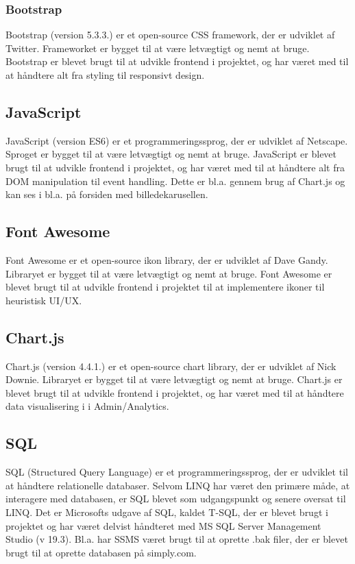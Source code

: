 \subsubsection{Bootstrap}
Bootstrap (version 5.3.3.) er et open-source CSS framework, der er udviklet af Twitter. Frameworket er bygget til at være letvægtigt og nemt at bruge.
Bootstrap er blevet brugt til at udvikle frontend i projektet, og har været med til at håndtere alt fra styling til responsivt design.

\subsection{JavaScript}
JavaScript (version ES6) er et programmeringssprog, der er udviklet af Netscape. Sproget er bygget til at være letvægtigt og nemt at bruge.
JavaScript er blevet brugt til at udvikle frontend i projektet, og har været med til at håndtere alt fra DOM manipulation til event handling.
Dette er bl.a. gennem brug af Chart.js og kan ses i bl.a. på forsiden med billedekarusellen.

\subsection{Font Awesome}
Font Awesome er et open-source ikon library, der er udviklet af Dave Gandy. Libraryet er bygget til at være letvægtigt og nemt at bruge.
Font Awesome er blevet brugt til at udvikle frontend i projektet til at implementere ikoner til heuristisk UI/UX.

\subsection{Chart.js}
Chart.js (version 4.4.1.) er et open-source chart library, der er udviklet af Nick Downie. Libraryet er bygget til at være letvægtigt og nemt at bruge.
Chart.js er blevet brugt til at udvikle frontend i projektet, og har været med til at håndtere data visualisering i i Admin/Analytics.

\subsection{SQL}
SQL (Structured Query Language) er et programmeringssprog, der er udviklet til at håndtere relationelle databaser.
Selvom LINQ har været den primære måde, at interagere med databasen, er SQL blevet som udgangspunkt og senere oversat til LINQ.
Det er Microsofts udgave af SQL, kaldet T-SQL, der er blevet brugt i projektet og har været delvist håndteret med MS SQL Server Management Studio (v 19.3).
Bl.a. har SSMS været brugt til at oprette .bak filer, der er blevet brugt til at oprette databasen på simply.com.


